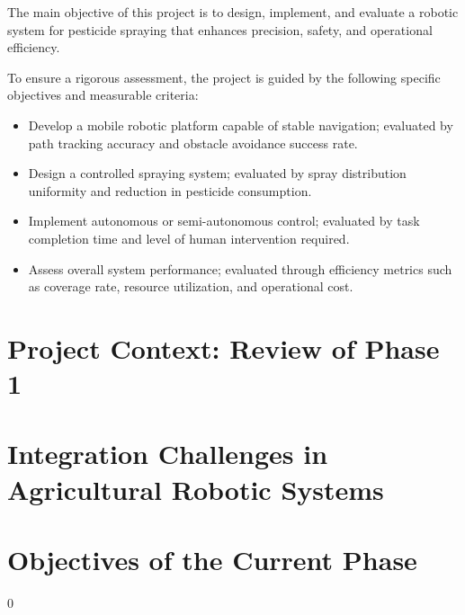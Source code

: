 The main objective of this project is to design, implement, and evaluate a robotic system for pesticide spraying that enhances precision, safety, and operational efficiency.

To ensure a rigorous assessment, the project is guided by the following specific objectives and measurable criteria:

\begin{itemize}
    \item Develop a mobile robotic platform capable of stable navigation; evaluated by path tracking accuracy and obstacle avoidance success rate.
    \item Design a controlled spraying system; evaluated by spray distribution uniformity and reduction in pesticide consumption.
    \item Implement autonomous or semi-autonomous control; evaluated by task completion time and level of human intervention required.
    \item Assess overall system performance; evaluated through efficiency metrics such as coverage rate, resource utilization, and operational cost.
\end{itemize}

\section{Project Context: Review of Phase 1}
\section{Integration Challenges in Agricultural Robotic Systems}
\section{Objectives of the Current Phase}0